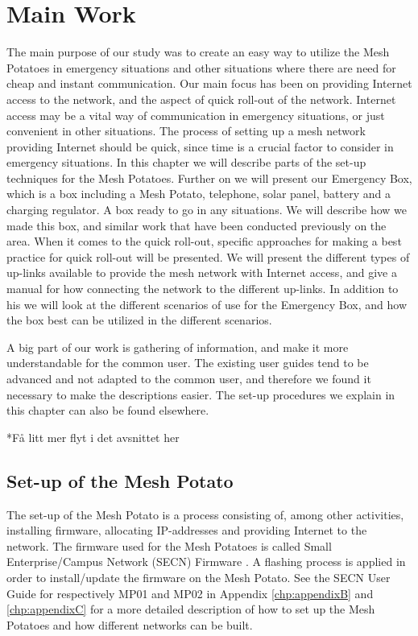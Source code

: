 \chapter{Main Work}
\label{chp:quickrollout} 

The main purpose of our study was to create an easy way to utilize the Mesh Potatoes in emergency situations and other situations where there are need for cheap and instant communication. Our main focus has been on providing Internet access to the network, and the aspect of quick roll-out of the network. Internet access may be a vital way of communication in emergency situations, or just convenient in other situations. The process of setting up a mesh network providing Internet should be quick, since time is a crucial factor to consider in emergency situations. In this chapter we will describe parts of the set-up techniques for the Mesh Potatoes. Further on we will present our Emergency Box, which is a box including a Mesh Potato, telephone, solar panel, battery and a charging regulator. A box ready to go in any situations. We will describe how we made this box, and similar work that have been conducted previously on the area. When it comes to the quick roll-out, specific approaches for making a best practice for quick roll-out will be presented. We will present the different types of up-links available to provide the mesh network with Internet access, and give a manual for how connecting the network to the different up-links. In addition to his we will look at the different scenarios of use for the Emergency Box, and how the box best can be utilized in the different scenarios. 

A big part of our work is gathering of information, and make it more understandable for the common user. The existing user guides tend to be advanced and not adapted to the common user, and therefore we found it necessary to make the descriptions easier. The set-up procedures we explain in this chapter can also be found elsewhere. 

*Få litt mer flyt i det avsnittet her

\section{Set-up of the Mesh Potato}
The set-up of the Mesh Potato is a process consisting of, among other activities, installing firmware, allocating IP-addresses and providing Internet to the network. The firmware used for the Mesh Potatoes is called Small Enterprise/Campus Network (SECN) Firmware \cite{ChoosingFirmware}. A flashing process is applied in order to install/update the firmware on the Mesh Potato. See the SECN User Guide for respectively MP01 and MP02 in Appendix \ref{chp:appendixB} and \ref{chp:appendixC} for a more detailed description of how to set up the Mesh Potatoes and how different networks can be built. 


